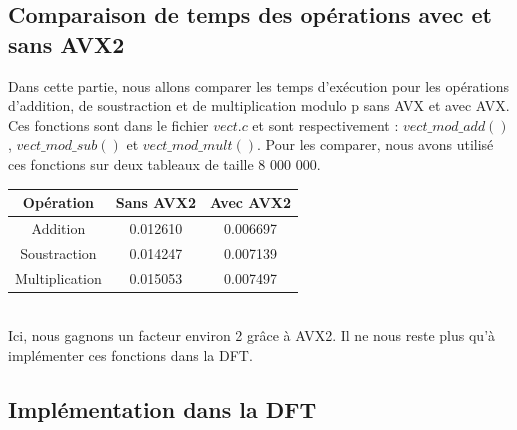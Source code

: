 \documentclass[12pt, a4paper]{article}
\begin{document}
\subsection{Comparaison de temps des opérations avec et sans AVX2}

Dans cette partie, nous allons comparer les temps d'exécution pour les opérations d'addition, de soustraction et de multiplication modulo p sans AVX et avec AVX. Ces fonctions sont dans le fichier $vect.c$ et sont respectivement :
$vect\_mod\_add()$, $vect\_mod\_sub()$ et $vect\_mod\_mult()$.
 Pour les comparer, nous avons utilisé ces fonctions sur deux tableaux de taille 8 000 000.

\begin{center}
\begin{tabular}{||c c c||}
\hline
Opération & Sans AVX2 & Avec AVX2 \\
\hline\hline
Addition & 0.012610 & 0.006697 \\
\hline
Soustraction & 0.014247 & 0.007139 \\
\hline
Multiplication & 0.015053 & 0.007497 \\
\hline
\end{tabular}
\end{center}
{}
\ \\
\indent Ici, nous gagnons un facteur environ 2 grâce à AVX2. Il ne nous reste plus qu'à implémenter ces fonctions dans la DFT.

\subsection{Implémentation dans la DFT}
\end{document}
